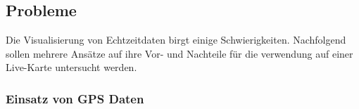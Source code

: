 
  
\subsection{Probleme}
\label{sub:probleme}

  Die Visualisierung von Echtzeitdaten birgt einige Schwierigkeiten. Nachfolgend sollen mehrere Ansätze auf ihre Vor- und Nachteile für die verwendung auf einer Live-Karte untersucht werden.

  \subsubsection{Einsatz von GPS Daten}
  \label{ssub:einsatz_von_gps_daten}

